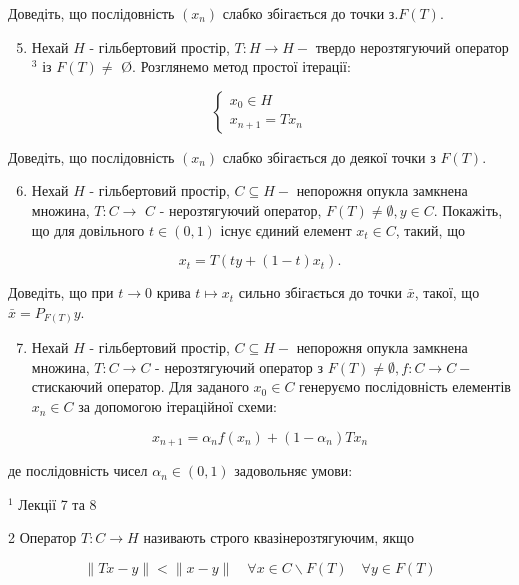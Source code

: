 \documentclass[10pt]{article}
\begin{document}
Доведіть, що послідовність $\left(x_{n}\right)$ слабко збігається до точки $з . F(T)$.

\begin{enumerate}
  \setcounter{enumi}{4}
  \item Нехай $H$ - гільбертовий простір, $T: H \rightarrow H-$ твердо нерозтягуючий оператор $^{3}$ із $F(T) \neq$ Ø. Розглянемо метод простої ітерації:
\end{enumerate}

$$
\left\{\begin{array}{l}
x_{0} \in H \\
x_{n+1}=T x_{n}
\end{array}\right.
$$

Доведіть, що послідовність $\left(x_{n}\right)$ слабко збігається до деякої точки з $F(T)$.

\begin{enumerate}
  \setcounter{enumi}{5}
  \item Нехай $H$ - гільбертовий простір, $C \subseteq H-$ непорожня опукла замкнена множина, $T: C \rightarrow$ $C$ - нерозтягуючий оператор, $F(T) \neq \emptyset, y \in C$. Покажіть, що для довільного $t \in(0,1)$ існує єдиний елемент $x_{t} \in C$, такий, що
\end{enumerate}

$$
x_{t}=T\left(t y+(1-t) x_{t}\right) .
$$

Доведіть, що при $t \rightarrow 0$ крива $t \mapsto x_{t}$ сильно збігається до точки $\bar{x}$, такої, що $\bar{x}=P_{F(T)} y$.

\begin{enumerate}
  \setcounter{enumi}{6}
  \item Нехай $H$ - гільбертовий простір, $C \subseteq H-$ непорожня опукла замкнена множина, $T: C \rightarrow C$ - нерозтягуючий оператор з $F(T) \neq \emptyset, f: C \rightarrow C-$ стискаючий оператор. Для заданого $x_{0} \in C$ генеруємо послідовність елементів $x_{n} \in C$ за допомогою ітераційної схеми:
\end{enumerate}

$$
x_{n+1}=\alpha_{n} f\left(x_{n}\right)+\left(1-\alpha_{n}\right) T x_{n}
$$

де послідовність чисел $\alpha_{n} \in(0,1)$ задовольняє умови:

${ }^{1}$ Лекції 7 та 8

2 Оператор $T: C \rightarrow H$ називають строго квазінерозтягуючим, якщо

$$
\|T x-y\|<\|x-y\| \quad \forall x \in C \backslash F(T) \quad \forall y \in F(T)
$$
\end{document}
